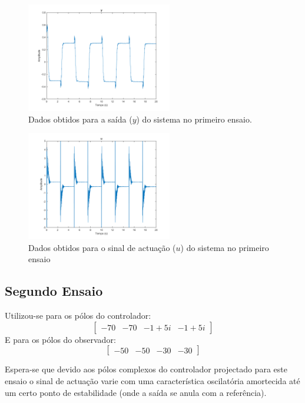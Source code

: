 \documentclass[%
  reprint,
  nofootinbib,
  amsmath,amssymb,
  aps,
  10pt,
  a4paper
]{revtex4-1}
\begin{document}
\begin{figure}[t]
\includegraphics[width=2.5in]{../imgs/dados_00_a/dados_00_a_y.png}
\caption{Dados obtidos para a saída ($y$) do sistema no primeiro ensaio.}
\label{fig:y_pri}
\end{figure}
\begin{figure}[t]
\includegraphics[width=2.5in]{../imgs/dados_00_a/dados_00_a_u.png}
\caption{Dados obtidos para o sinal de actuação ($u$) do sistema no primeiro ensaio}
\label{fig:u_pri}
\end{figure}

\subsection{Segundo Ensaio}

Utilizou-se para os pólos do controlador:
\begin{equation}
\begin{bmatrix}
-70 & -70  & -1+5i &-1+5i
\end{bmatrix}
\end{equation}
E para os pólos do observador:
\begin{equation}
\begin{bmatrix}
-50 & -50  & -30 &-30
\end{bmatrix}
\end{equation}

Espera-se que devido aos pólos complexos do controlador projectado para este ensaio o sinal de actuação varie com uma característica oscilatória amortecida até um certo ponto de estabilidade (onde a saída se anula com a referência).\\
\end{document}
